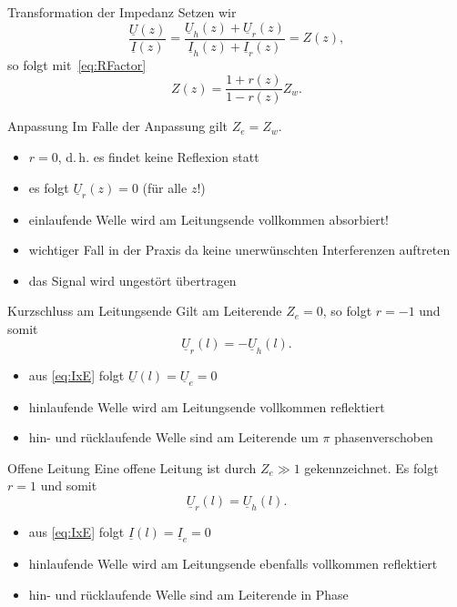 \documentclass{beamer}
\begin{document}
\begin{frame}{Transformation der Impedanz}
Setzen wir
\[
\frac{\underline{U}(z)}{\underline{I}(z)}
= \frac{\underline{U}_{h}(z) +
\underline{U}_{r}(z)}{\underline{I}_{h}(z) +
    \underline{I}_{r}(z)} = Z(z),
\]
so folgt mit~\eqref{eq:RFactor}
\[
Z(z) = \frac{1 + r(z)}{1 - r(z)} Z_{w}.
\]
\end{frame}


\begin{frame}{Anpassung}
Im Falle der Anpassung gilt $Z_{e} = Z_{w}$.
\begin{itemize}
    \item <1-> $r = 0$, d.\,h. es findet keine Reflexion statt
    \item <2-> es folgt $\underline{U}_{r}(z) = 0$ (für \alert{alle} $z$!)
    \item <3-> einlaufende Welle wird am Leitungsende vollkommen absorbiert!
    \item <4-> wichtiger Fall in der Praxis da keine unerwünschten Interferenzen auftreten
    \item <5-> das Signal wird ungestört übertragen
\end{itemize}
\end{frame}


\begin{frame}{Kurzschluss am Leitungsende}
Gilt am Leiterende $Z_{e} = 0$, so folgt $r = -1$ und somit
\[
\underline{U}_{r}(l) = - \underline{U}_{h}(l).
\]

\begin{itemize}
    \item<2-> aus \eqref{eq:IxE} folgt $\underline{U}(l) = \underline{U}_{e} = 0$
    \item<3-> hinlaufende Welle wird am Leitungsende vollkommen reflektiert
    \item<4-> hin- und rücklaufende Welle sind am Leiterende um $\pi$ phasenverschoben
\end{itemize}

\end{frame}


\begin{frame}{Offene Leitung}
Eine offene Leitung ist durch $Z_{e} \gg 1$ gekennzeichnet. Es folgt $r = 1$ und somit
\[
\underline{U}_{r}(l) = \underline{U}_{h}(l).
\]

\begin{itemize}
    \item<2-> aus \eqref{eq:IxE} folgt $\underline{I}(l) = \underline{I}_{e} = 0$
    \item<3-> hinlaufende Welle wird am Leitungsende ebenfalls vollkommen reflektiert
    \item<4-> hin- und rücklaufende Welle sind am Leiterende in Phase
\end{itemize}

\end{frame}
\end{document}
